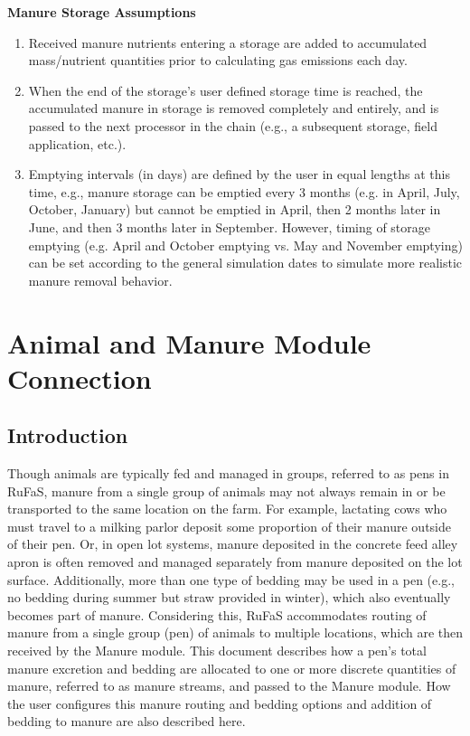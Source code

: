 \begin{refsection}
\textbf{Manure Storage Assumptions}
	\begin{enumerate}
            \item Received manure nutrients entering a storage are added to accumulated mass/nutrient quantities prior to calculating gas emissions each day.
            \item When the end of the storage’s user defined storage time is reached, the accumulated manure in storage is removed completely and entirely, and is passed to the next processor in the chain (e.g., a subsequent storage, field application, etc.).
            \item Emptying intervals (in days) are defined by the user in equal lengths at this time, e.g., manure storage can be emptied every 3 months (e.g. in April, July, October, January) but cannot be emptied in April, then 2 months later in June, and then 3 months later in September. However, timing of storage emptying (e.g. April and October emptying vs. May and November emptying) can be set according to the general simulation dates to simulate more realistic manure removal behavior.
	\end {enumerate}


\section{Animal and Manure Module Connection} 
\subsection{Introduction}

    Though animals are typically fed and managed in groups, referred to as pens in RuFaS, manure from a single group of animals may not always remain in or be transported to the same location on the farm. For example, lactating cows who must travel to a milking parlor deposit some proportion of their manure outside of their pen. Or, in open lot systems, manure deposited in the concrete feed alley apron is often removed and managed separately from manure deposited on the lot surface. Additionally, more than one type of bedding may be used in a pen (e.g., no bedding during summer but straw provided in winter), which also eventually becomes part of manure. Considering this, RuFaS accommodates routing of manure from a single group (pen) of animals to multiple locations, which are then received by the Manure module. This document describes how a pen’s total manure excretion and bedding are allocated to one or more discrete quantities of manure, referred to as manure streams, and passed to the Manure module. How the user configures this manure routing and bedding options and addition of bedding to manure are also described here.


\end{refsection}
